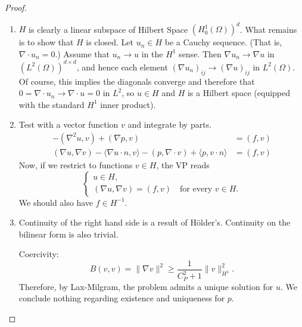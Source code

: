 \documentclass[letterpaper,twoside,11pt]{article}
\theoremstyle{mystyle}
\begin{document}
\begin{proof}
  \begin{enumerate}
    \item $H$ is clearly a linear subspace of Hilbert Space $\left( H_0^1 (\Omega) \right)^d$. What remains is to show that $H$ is closed. Let $u_n \in H$ be a Cauchy sequence. (That is, $\nabla \cdot u_n = 0$.) Assume that $u_n \to u $ in the $H^1$ sense. Then $\nabla u_n \to \nabla u$ in $(L^2(\Omega))^{d\times d}$, and hence each element $\left( \nabla u_n \right)_{ij} \to \left( \nabla u \right)_{ij}$ in $L^2\left( \Omega \right)$. Of course, this implies the diagonals converge and therefore that $0=\nabla \cdot u_n \to \nabla \cdot u =0$ in $L^2$, so $u\in H$ and $H$ is a Hilbert space (equipped with the standard $H^1$ inner product). 
    \item Test with a vector function $v$ and integrate by parts. 
    \begin{align*}
      -\left( \nabla^2 u, v \right) + \left( \nabla p , v \right) &= \left( f, v \right) \\
      \left( \nabla u, \nabla v \right) - \langle\nabla u \cdot n, v\rangle - \left( p, \nabla \cdot v \right) + \langle p, v\cdot n \rangle  &= \left( f, v \right)
    \end{align*}
    Now, if we restrict to functions $v \in H$, the VP reads
    \[\left\{ {\begin{array}{*{20}{l}}
      u \in H, \\[.2cm]
      \left( \nabla u, \nabla v \right) = \left( f, v \right) \quad \text{for every } v \in H.
    \end{array}} \right.\]
    We should also have $f \in H^{-1}$. 
    \item Continuity of the right hand side is a result of H\"older's. Continuity on the bilinear form is also trivial. 
    
    Coercivity:
    \[B(v,v)= \|\nabla v\|^2 \geq \frac{1}{C_P^2+1}\|v\|^2_{H^1}.\]
    Therefore, by Lax-Milgram, the problem admits a unique solution for $u$. We conclude nothing regarding existence and uniqueness for $p$. 

  \end{enumerate}
\end{proof}
\end{document}
